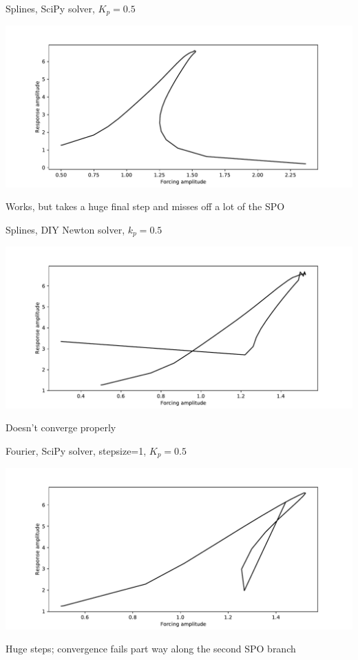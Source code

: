 \documentclass[presentation]{beamer}
\begin{document}
\begin{frame}[label={sec:org4ee8291}]{Splines, SciPy solver, \(K_p=0.5\)}
\begin{center}
\includegraphics[width=.9\linewidth]{./kp0d5_transtime100_scipy.pdf}
\end{center}

Works, but takes a huge final step and misses off a lot of the SPO
\end{frame}

\begin{frame}[label={sec:org5642aa5}]{Splines, DIY Newton solver, \(k_p=0.5\)}
\begin{center}
\includegraphics[width=.9\linewidth]{./kp0d5_transtime100_newton.pdf}
\end{center}

Doesn't converge properly
\end{frame}

\begin{frame}[label={sec:org0a2bd98}]{Fourier, SciPy solver, stepsize=1, \(K_p=0.5\)}
\begin{center}
\includegraphics[width=.9\linewidth]{./kp0d5_transtime100_scipy_fourier.pdf}
\end{center}

Huge steps; convergence fails part way along the second SPO branch
\end{frame}
\end{document}
